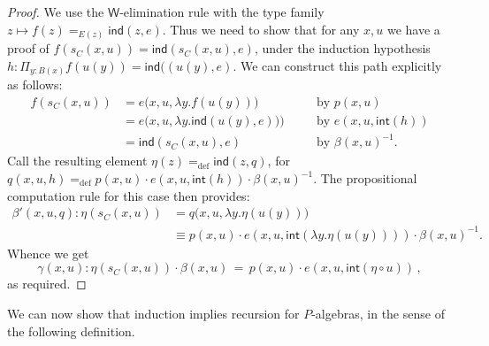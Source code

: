 \documentclass[10pt,a4paper,oneside,reqno]{amsart}
\numberwithin{equation}{section}
\theoremstyle{mythm}
\theoremstyle{mydef}
\theoremstyle{myrmk}
\newcommand{\by}[1]{\quad&&\text{by {$#1$}}}
\newcommand{\deq}{\equiv}
\newcommand{\peq}{=}
\newcommand{\defeq}{=_{\mathrm{def}}}
\renewcommand{\int}{\mathsf{int}}
\newcommand{\prd}[1]{\Pi_{#1}}
\newcommand{\W}{\mathsf{W}}
\newcommand{\ind}{\mathsf{ind}}
\begin{document}
\begin{proof}
We use the $\W$-elimination rule with the type family $z \mapsto f(z) =_{E(z)} \ind(z,e)$. Thus we need to show that for any $x,u$ we have a proof of $f(s_C(x,u)) = \ind(s_C(x,u),e)$, under the induction hypothesis $h : \prd{y:B(x)} f(u(y)) = \ind((u(y),e)$. We can construct this path explicitly as follows:
\begin{align*}
f(s_C(x,u)) &= e\big(x,u,\lambda y.f(u(y))\big) \by{p(x,u)}\\
	&= e\big(x,u,\lambda y.\ind(u(y),e))\big) \by{e(x,u,\int(h))}\\
	&= \ind(s_C(x,u),e) \by{\beta(x,u)^{-1}}.
\end{align*}
Call the resulting element $\eta(z) \defeq \ind(z,q)$, for $q(x,u,h) \defeq p(x,u)\cdot e(x,u,\int(h))\cdot\beta(x,u)^{-1}$.
The propositional computation rule for this case then provides:
\begin{align*}
\beta'(x,u,q) :  \eta(s_C(x,u)) &\peq q\big(x,u,\lambda{y}.\eta(u(y))\big)\\
	&\deq p(x,u)\cdot e(x,u,\int(\lambda y.\eta(u(y))))\cdot\beta(x,u)^{-1}.
\end{align*}
Whence we get
\[
\gamma (x,u) :  \eta(s_C(x,u)) \cdot \beta(x,u)\,\peq\,
 	p(x,u)\cdot e(x,u,\int(\eta\circ u))\, ,
	\]
as required.
\end{proof}

We can now show that induction implies recursion for $P$-algebras, in the sense of the following definition.
\end{document}
